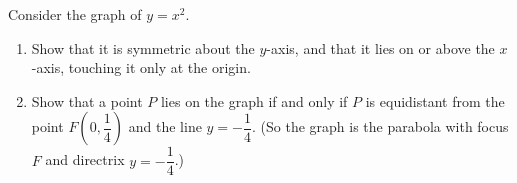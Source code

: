Consider the graph of $y=x^2$.
\begin{enumerate}
\item[(a)] Show that it is symmetric about the $y$-axis, and that it lies on or above the $x$-axis, touching it only at the origin.
\item[(b)] Show that a point $P$ lies on the graph if and only if $P$ is equidistant from the point $F\left(0,\dfrac14\right)$ and the line $y=-\dfrac14$. (So the graph is the parabola with focus $F$ and directrix $y=-\dfrac14$.)
\end{enumerate}
